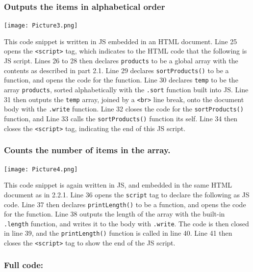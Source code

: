 \documentclass[a4paper]{article}
\begin{document}
\subsubsection{Outputs the items in alphabetical order}
\noindent\texttt{[image: Picture3.png]} \par
This code snippet is written in JS embedded in an HTML document. Line 25 opens the \verb|<script>| tag, which indicates to the HTML code that the following is JS script. Lines 26 to 28 then declares \verb|products| to be a global array with the contents as described in part 2.1. Line 29 declares \verb|sortProducts()| to be a function, and opens the code for the function. Line 30 declares \verb|temp| to be the array \verb|products|, sorted alphabetically with the \verb|.sort| function built into JS. Line 31 then outputs the \verb|temp| array, joined by a \verb|<br>| line break, onto the document body with the \verb|.write| function. Line 32 closes the code for the \verb|sortProducts()| function, and Line 33 calls the \verb|sortProducts()| function its self. Line 34 then closes the \verb|<script>| tag, indicating the end of this JS script. \newpage
\subsubsection{Counts the number of items in the array.}
\noindent\texttt{[image: Picture4.png]} \par
This code snippet is again written in JS, and embedded in the same HTML document as in 2.2.1. Line 36 opens the \verb|script| tag to declare the following as JS code. Line 37 then declares \verb|printLength()| to be a function, and opens the code for the function. Line 38 outputs the length of the array with the built-in \verb|.length| function, and writes it to the body with \verb|.write|.  The code is then closed in line 39, and the \verb|printLength()| function is called in line 40. Line 41 then closes the \verb|<script>| tag to show the end of the JS script.
\subsubsection{Full code:}
\end{document}
